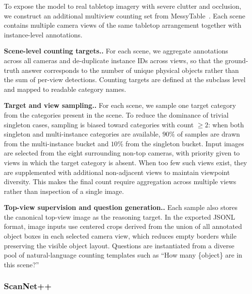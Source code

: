 \documentclass{llmxive}
\providecommand{\paragraph}[1]{\vspace{.5em}\noindent\textbf{#1.}}
\begin{document}
To expose the model to real tabletop imagery with severe clutter and occlusion, we construct an additional multiview counting set from MessyTable~\cite{cai2020messytable}. Each scene contains multiple camera views of the same tabletop arrangement together with instance-level annotations.

\paragraph{Scene-level counting targets.}
For each scene, we aggregate annotations across all cameras and de-duplicate instance IDs across views, so that the ground-truth answer corresponds to the number of unique physical objects rather than the sum of per-view detections. Counting targets are defined at the subclass level and mapped
to readable category names.

\paragraph{Target and view sampling.}
For each scene, we sample one target category from the categories present in the scene. To reduce the dominance of trivial singleton cases, sampling is biased toward categories with count $\geq 2$: when both singleton and multi-instance categories are available, $90\%$ of samples are drawn from
the multi-instance bucket and $10\%$ from the singleton bucket. Input images are selected from the eight surrounding non-top cameras, with priority given to views in which the target category is absent. When too few such views exist, they are supplemented with additional non-adjacent views to
maintain viewpoint diversity. This makes the final count require aggregation across multiple views rather than inspection of a single image.

\paragraph{Top-view supervision and question generation.}
Each sample also stores the canonical top-view image as the reasoning target. In the exported JSONL format, image inputs use centered crops derived from the union of all annotated object boxes in each selected camera view, which reduces empty borders while preserving the visible object layout.
Questions are instantiated from a diverse pool of natural-language counting templates such as ``How many \{object\} are in this scene?''

\subsubsection{ScanNet++}
\end{document}
